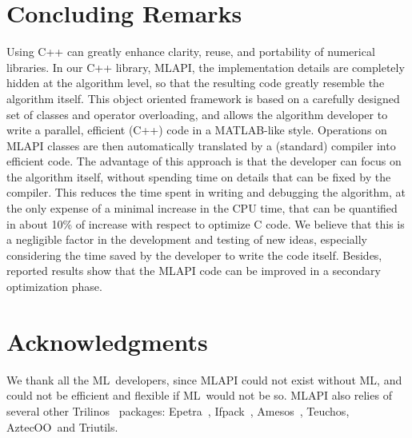 \documentclass{article}[11pt]
\newcommand{\Aztecoo}  {{\sc AztecOO}}
\newcommand{\aztecoo}  {{\Aztecoo}}
\newcommand{\epetra}  {{\sc Epetra}}
\newcommand{\ML}     {{\sc ML}}
\newcommand{\trilinos}  {{\sc Trilinos}}
\newcommand{\amesos}  {{\sc Amesos}}
\newcommand{\triutils}  {{\sc Triutils}}
\newcommand{\ifpack}  {{\sc Ifpack}}
\newcommand{\teuchos}  {{\sc Teuchos}}
\newcommand{\MLAPI}  {{\sc MLAPI }}
\newcommand{\MLAPIns}  {{\sc MLAPI}}
\begin{document}
\section{Concluding Remarks}
\label{sec:conclusions}

Using C++ can greatly enhance clarity, reuse, and
portability of numerical libraries. In our C++  library, \MLAPIns, 
  the implementation details are completely hidden at
the algorithm level, so that the resulting code greatly resemble the 
algorithm itself. This object oriented framework is based on a
carefully designed set of classes and operator overloading, and allows the
algorithm developer to write a parallel, efficient (C++) code in a MATLAB-like
style. Operations on \MLAPI classes are then automatically translated by a
(standard) compiler into efficient code.  The advantage of this approach is
that the developer can focus on the algorithm itself, without spending time on
details that can be fixed by the compiler. This reduces the time spent in
writing and debugging the algorithm, at the only expense of a minimal increase
in the CPU time, that can be quantified in about 10\% of increase with respect
to optimize C code. We believe that this is a negligible 
factor in the development and testing of new
ideas, especially considering the time saved by the developer to write the
code itself. Besides, reported results show that the \MLAPI code can be
improved in a secondary optimization phase.

\section*{Acknowledgments}
\label{sec:acks}

We thank all the \ML\ developers, since \MLAPI could not exist without \ML, and
could not be efficient and flexible if \ML\ would not be so. \MLAPI also
relies of several other \trilinos~\cite{Trilinos-home-page} packages:
\epetra~\cite{epetra-guide}, \ifpack~\cite{ifpack-guide},
  \amesos~\cite{amesos-guide}, \teuchos, \aztecoo\ and \triutils. 


\end{document}
